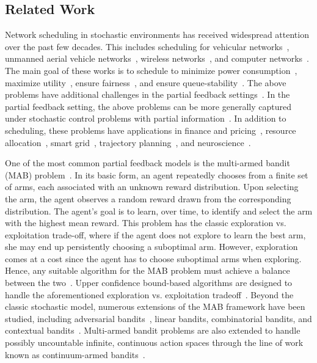 \documentclass[12pt,draftcls, onecolumn]{IEEEtran}
\begin{document}
\subsection{Related Work}
Network scheduling in stochastic environments has received widespread attention over the past few decades. This includes scheduling for vehicular networks~\cite{Cai2024}, unmanned aerial vehicle networks~\cite{Kong2021}, wireless networks~\cite{Jung2007,Tarzjani2025}, and computer networks~\cite{Maguluri2012StochasticMO}. The main goal of these works is to schedule to minimize power consumption~\cite{Cruz2003}, maximize utility~\cite{Palomar2006}, ensure fairness~\cite{Songwu1999}, and ensure queue-stability~\cite{Neely2010coml}. The above problems have additional challenges in the partial feedback settings~\cite{lyu2017optimal,li2020multi,Huang2024}. In the partial feedback setting, the above problems can be more generally captured under stochastic control problems with partial information~\cite{KAELBLING199899}. In addition to scheduling, these problems have applications in finance and pricing~\cite{Kleinberg2003,Chichportich2023}, resource allocation~\cite{zuo2021combinatorial}, smart grid~\cite{Shardin02012017}, trajectory planning~\cite{Sun2021}, and neuroscience~\cite{Velentzas117598}.

One of the most common partial feedback models is the multi-armed bandit (MAB) problem~\cite{Lai1985,Auer2002FinitetimeAO}. In its basic form, an agent repeatedly chooses from a finite set of arms, each associated with an unknown reward distribution. Upon selecting the arm, the agent observes a random reward drawn from the corresponding distribution. The agent's goal is to learn, over time, to identify and select the arm with the highest mean reward. This problem has the classic exploration vs. exploitation trade-off, where if the agent does not explore to learn the best arm, she may end up persistently choosing a suboptimal arm. However, exploration comes at a cost since the agent has to choose suboptimal arms when exploring. Hence, any suitable algorithm for the MAB problem must achieve a balance between the two~\cite{Cesa-Bianchi_Lugosi_2006, Bubeck2012}. Upper confidence bound-based algorithms are designed to handle the aforementioned exploration vs. exploitation tradeoff~\cite{Bubeck2012,lattimore_szepesvári_2020}. Beyond the classic stochastic model, numerous extensions of the MAB framework have been studied, including adversarial bandits~\cite{auer1995gambling,pmlr-v75-wei18a}, linear bandits, combinatorial bandits, and contextual bandits~\cite{Bubeck2012}. Multi-armed bandit problems are also extended to handle possibly uncountable infinite, continuous action spaces through the line of work known as continuum-armed bandits~\cite{Agrawal1995,Kleinberg2008,pmlr-v134-podimata21a}.
\end{document}
